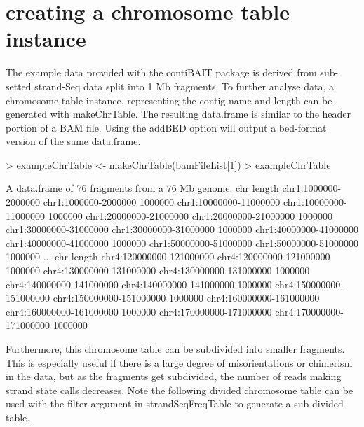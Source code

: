\documentclass{article}
\begin{document}
\section{creating a chromosome table instance}

The example data provided with the contiBAIT package is derived from sub-setted strand-Seq data split into 1 Mb fragments. To further analyse data, a chromosome table instance, representing the contig name and length can be generated with makeChrTable.  The resulting data.frame is similar to the header portion of a BAM file.  Using the addBED option will output a bed-format version of the same data.frame. 

\begin{Schunk}
\begin{Sinput}
> exampleChrTable <- makeChrTable(bamFileList[1]) 
> exampleChrTable
\end{Sinput}
\begin{Soutput}
A data.frame of 76 fragments from a  76 Mb genome.
                                          chr  length
chr1:1000000-2000000     chr1:1000000-2000000 1000000
chr1:10000000-11000000 chr1:10000000-11000000 1000000
chr1:20000000-21000000 chr1:20000000-21000000 1000000
chr1:30000000-31000000 chr1:30000000-31000000 1000000
chr1:40000000-41000000 chr1:40000000-41000000 1000000
chr1:50000000-51000000 chr1:50000000-51000000 1000000
...                                              chr  length
chr4:120000000-121000000 chr4:120000000-121000000 1000000
chr4:130000000-131000000 chr4:130000000-131000000 1000000
chr4:140000000-141000000 chr4:140000000-141000000 1000000
chr4:150000000-151000000 chr4:150000000-151000000 1000000
chr4:160000000-161000000 chr4:160000000-161000000 1000000
chr4:170000000-171000000 chr4:170000000-171000000 1000000
\end{Soutput}
\end{Schunk}

Furthermore, this chromosome table can be subdivided into smaller fragments. This is especially useful if there is a large degree of misorientations or chimerism in the data, but as the fragments get subdivided, the number of reads making strand state calls decreases.  Note the following divided chromosome table can be used with the filter argument in strandSeqFreqTable
to generate a sub-divided table.
\end{document}
